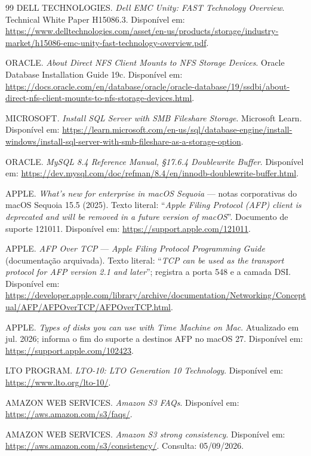 \documentclass[11pt,a4paper]{article}
\begin{document}
\begin{thebibliography}{99}
 DELL TECHNOLOGIES. \textit{Dell EMC Unity: FAST Technology Overview}. Technical
White Paper H15086.3. Disponível em:
\url{https://www.delltechnologies.com/asset/en-us/products/storage/industry-market/h15086-emc-unity-fast-technology-overview.pdf}.

 ORACLE. \textit{About Direct NFS Client Mounts to NFS Storage Devices}. Oracle
Database Installation Guide 19c. Disponível em:
\url{https://docs.oracle.com/en/database/oracle/oracle-database/19/ssdbi/about-direct-nfs-client-mounts-to-nfs-storage-devices.html}.

 MICROSOFT. \textit{Install SQL Server with SMB Fileshare Storage}. Microsoft
Learn. Disponível em:
\url{https://learn.microsoft.com/en-us/sql/database-engine/install-windows/install-sql-server-with-smb-fileshare-as-a-storage-option}.

 ORACLE. \textit{MySQL 8.4 Reference Manual, §17.6.4 Doublewrite Buffer}.
Disponível em: \url{https://dev.mysql.com/doc/refman/8.4/en/innodb-doublewrite-buffer.html}.

 APPLE. \textit{What's new for enterprise in macOS Sequoia} --- notas
corporativas do macOS Sequoia 15.5 (2025). Texto literal: ``\textit{Apple Filing Protocol (AFP)
client is deprecated and will be removed in a future version of macOS}''. Documento de suporte
121011. Disponível em: \url{https://support.apple.com/121011}.

 APPLE. \textit{AFP Over TCP} --- \textit{Apple Filing Protocol Programming
Guide} (documentação arquivada). Texto literal: ``\textit{TCP can be used as the transport protocol
for AFP version 2.1 and later}''; registra a porta 548 e a camada DSI. Disponível em:
\url{https://developer.apple.com/library/archive/documentation/Networking/Conceptual/AFP/AFPOverTCP/AFPOverTCP.html}.

 APPLE. \textit{Types of disks you can use with Time Machine on Mac}.
Atualizado em jul. 2026; informa o fim do suporte a destinos AFP no macOS 27.
Disponível em: \url{https://support.apple.com/102423}.

 LTO PROGRAM. \textit{LTO-10: LTO Generation 10 Technology}. Disponível em:
\url{https://www.lto.org/lto-10/}.

 AMAZON WEB SERVICES. \textit{Amazon S3 FAQs}. Disponível em:
\url{https://aws.amazon.com/s3/faqs/}.

 AMAZON WEB SERVICES. \textit{Amazon S3 strong consistency}.
Disponível em: \url{https://aws.amazon.com/s3/consistency/}. Consulta: 05/09/2026.


\end{thebibliography}
\end{document}
